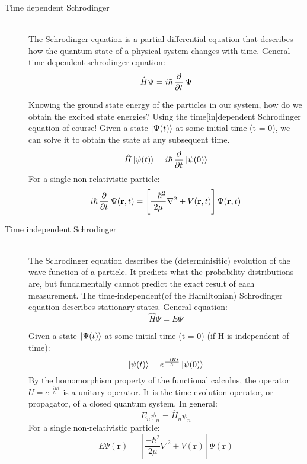 \documentclass[12pt,letterpaper,oneside,final,titlepage]{article}               %
\numberwithin{equation}{section} %
\renewcommand{\vec}[1]{\mathbf{#1}}
\begin{document}
\begin{description}
    \item[Time dependent Schrodinger] \hfill \\
    The Schrodinger equation is a partial differential equation that describes how the quantum state of a physical system changes with time. General time-dependent schrodinger equation:
    \begin{equation}
        \hat{H}\Psi = i\hbar\dpd{}{t}\Psi
    \end{equation}


    Knowing the ground state energy of the particles in our system, how do we obtain the excited state energies? 
    Using the time[in]dependent Schrodinger equation of course! 
    Given a state $\ket{\Psi(t)}$ at some initial time (t = 0), we can solve it to obtain the state at any subsequent time.
    \begin{equation}
        \hat{H}\ket{\psi(t)} = i\hbar\dpd{}{t}\ket{\psi(0)}  
    \end{equation}
    For a single non-relativistic particle:
    \begin{equation}
        i\hbar\dpd{}{t}\Psi(\vec{r},t) = \left[\frac{-\hbar^{2}}{2\mu}\nabla^{2} + V(\vec{r},t)\right]\Psi(\vec{r},t)
    \end{equation}

    \item[Time independent Schrodinger] \hfill \\
    The Schrodinger equation describes the (determinisitic) evolution of the wave function of a particle.
    It predicts what the probability distributions are, but fundamentally cannot predict the exact result of each measurement.
    The time-independent(of the Hamiltonian) Schrodinger equation describes stationary states.
    General equation:
    \begin{equation}
        \hat{H}\Psi = E\Psi
    \end{equation}

    Given a state $\ket{\Psi(t)}$ at some initial time (t = 0) (if H is independent of time):
    \begin{equation}
        \ket{\psi(t)} = e^{\frac{-iHt}{\hbar}}\ket{\psi(0)}
    \end{equation}
    By the homomorphism property of the functional calculus, the operator $U = e^{\frac{-iHt}{\hbar}}$ is a unitary operator.
    It is the time evolution operator, or propagator, of a closed quantum system. 
    In general:
    \begin{equation}
        E_{n}\psi_{n} = \hat{H}_{n}\psi_{n}
    \end{equation}
    For a single non-relativistic particle:
    \begin{equation}
        E\Psi(\vec{r}) = \left[\frac{-\hbar^{2}}{2\mu}\nabla^{2} + V(\vec{r})\right]\Psi(\vec{r})
    \end{equation}


\end{description}
\end{document}
